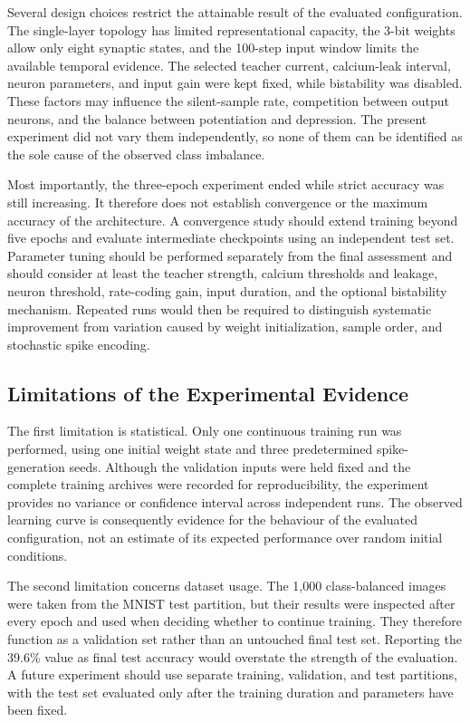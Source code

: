 Several design choices restrict the attainable result of the evaluated configuration. The single-layer topology has limited representational capacity, the 3-bit weights allow only eight synaptic states, and the 100-step input window limits the available temporal evidence. The selected teacher current, calcium-leak interval, neuron parameters, and input gain were kept fixed, while bistability was disabled. These factors may influence the silent-sample rate, competition between output neurons, and the balance between potentiation and depression. The present experiment did not vary them independently, so none of them can be identified as the sole cause of the observed class imbalance.

Most importantly, the three-epoch experiment ended while strict accuracy was still increasing. It therefore does not establish convergence or the maximum accuracy of the architecture. A convergence study should extend training beyond five epochs and evaluate intermediate checkpoints using an independent test set. Parameter tuning should be performed separately from the final assessment and should consider at least the teacher strength, calcium thresholds and leakage, neuron threshold, rate-coding gain, input duration, and the optional bistability mechanism. Repeated runs would then be required to distinguish systematic improvement from variation caused by weight initialization, sample order, and stochastic spike encoding.

\subsection{Limitations of the Experimental Evidence}

The first limitation is statistical. Only one continuous training run was performed, using one initial weight state and three predetermined spike-generation seeds. Although the validation inputs were held fixed and the complete training archives were recorded for reproducibility, the experiment provides no variance or confidence interval across independent runs. The observed learning curve is consequently evidence for the behaviour of the evaluated configuration, not an estimate of its expected performance over random initial conditions.

The second limitation concerns dataset usage. The 1,000 class-balanced images were taken from the MNIST test partition, but their results were inspected after every epoch and used when deciding whether to continue training. They therefore function as a validation set rather than an untouched final test set. Reporting the 39.6\% value as final test accuracy would overstate the strength of the evaluation. A future experiment should use separate training, validation, and test partitions, with the test set evaluated only after the training duration and parameters have been fixed.

